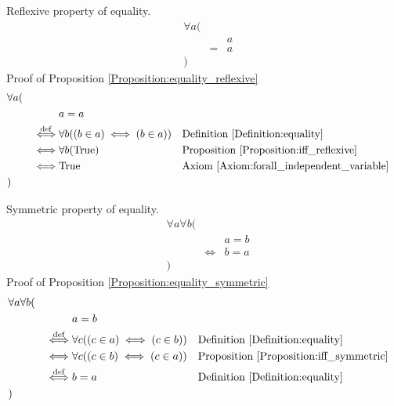 \begin{prop}
\label{Proposition:equality_reflexive}
Reflexive property of equality.
\begin{align*}
& \forall a ( \\
& & & a \\
& & = & a \\
& )
\end{align*}
Proof of Proposition \ref{Proposition:equality_reflexive}
\begin{align*}
& \forall a ( \\
& & & a = a \\
& & \overset{\operatorname{def}}{\iff} & \forall b ((b \in a) \iff (b \in a))
& & \text{Definition \ref{Definition:equality}} \\
& & \iff & \forall b (\text{True})
& & \text{Proposition \ref{Proposition:iff_reflexive}} \\
& & \iff & \text{True}
& & \text{Axiom \ref{Axiom:forall_independent_variable}} \\
& )
\end{align*}
\end{prop}

\begin{prop}
\label{Proposition:equality_symmetric}
Symmetric property of equality.
\begin{align*}
& \forall a \forall b ( \\
& & & a = b \\
& & \iff & b = a \\
& )
\end{align*}
Proof of Proposition \ref{Proposition:equality_symmetric}
\begin{align*}
& \forall a \forall b ( \\
& & & a = b \\
& & \overset{\operatorname{def}}{\iff} & \forall c ((c \in a) \iff (c \in b))
& & \text{Definition \ref{Definition:equality}} \\
& & \iff & \forall c ((c \in b) \iff (c \in a))
& & \text{Proposition \ref{Proposition:iff_symmetric}} \\
& & \overset{\operatorname{def}}{\iff} & b = a
& & \text{Definition \ref{Definition:equality}} \\
& )
\end{align*}
\end{prop}

